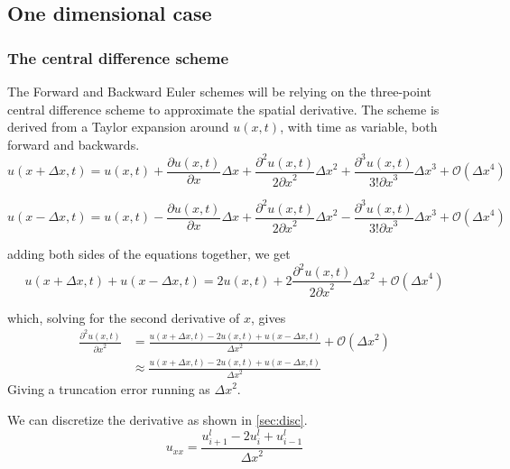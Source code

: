 \documentclass[10pt,a4paper]{article}
\newcommand{\bigO}{{\mathcal{O}}}
\newcommand{\dx}{{\Delta x}}
\newcommand{\px}{{\partial x}}
\newcommand{\pu}{{\partial u}}
\newcommand{\ppu}{{\partial^2 u}}
\newcommand{\pppu}{{\partial^3 u}}
\begin{document}
\subsection{One dimensional case}\label{sec:method:1d}
\subsubsection{The central difference scheme}\label{sec:cent}
The Forward and Backward Euler schemes will be relying on the three-point central difference scheme to approximate the spatial derivative. The scheme is derived from a Taylor expansion around $u(x,t)$, with time as variable, both forward and backwards.
\begin{equation}
u(x+\Delta x, t) = u(x,t) + \frac{\pu(x,t)}{\px}\dx + \frac{\ppu(x,t)}{2\px^2}\dx^2 + \frac{\pppu(x,t)}{3!\px^3}\dx^3 + \bigO(\dx^4)
\end{equation}

\begin{equation}
u(x-\Delta x, t) = u(x,t) - \frac{\pu(x,t)}{\px}\dx + \frac{\ppu(x,t)}{2\px^2}\dx^2 - \frac{\pppu(x,t)}{3!\px^3}\dx^3 + \bigO(\dx^4)
\end{equation}

adding both sides of the equations together, we get
\begin{equation}
u(x+\Delta x, t) + u(x-\Delta x, t) = 2u(x,t) + 2\frac{\ppu(x,t)}{2\px^2}\dx^2 + \bigO(\dx^4)
\end{equation}

which, solving for the second derivative of $x$, gives
\begin{equation}\begin{split}
\frac{\ppu(x,t)}{\px^2} &= \frac{u(x+\Delta x, t) - 2u(x,t) + u(x-\Delta x, t)}{\dx^2} + \bigO(\dx^2)\\
&\approx \frac{u(x+\Delta x, t) - 2u(x,t) + u(x-\Delta x, t)}{\dx^2}
\end{split}\end{equation}
Giving a truncation error running as $\dx^2$.

We can discretize the derivative as shown in \ref{sec:disc}.
\begin{equation}
u_{xx} = \frac{u_{i+1}^l - 2u_i^l+u_{i-1}^l}{\dx^2}
\end{equation}
\end{document}
